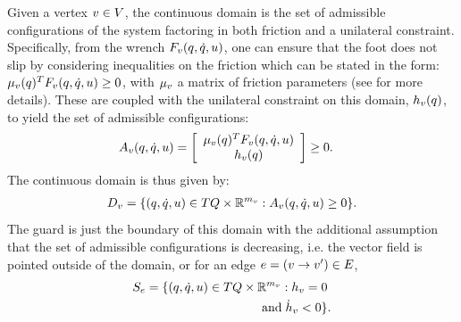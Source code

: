 Given a vertex $v \in V$, the continuous domain is the set of admissible configurations of the system factoring in both friction and a unilateral constraint. Specifically, from the wrench $F_v (q,\dot {q},u)$, one can ensure that the foot does not slip by considering inequalities on the friction which can be stated in the form: $\mu_v(q)^T F_v(q,\dot {q},u) \geq 0$, with $\mu_v$ a matrix of friction parameters (see \cite{SPSA:IFAC:11} for more details). These are coupled with the unilateral constraint on this domain, $h_v(q)$, to yield the set of admissible configurations:
\begin{align}
A_v(q,\dot {q},u) &= \left[
  \begin{array}{c}
    \mu_v(q)^T F_v(q,\dot {q},u) \\
    h_v(q)
  \end{array}
  \right] \geq 0.
\end{align}
The continuous domain is thus given by:
\begin{align}
 D_v = \{ (q,\dot {q},u) \in TQ \times \mathbb{R}^{m_v} : A_v(q,\dot {q},u) \geq 0 \}.
\end{align}
The guard is just the boundary of this domain with the additional assumption that the set of admissible configurations is decreasing, i.e. the vector field is pointed outside of the domain, or for an edge $e =(v \to v') \in E$,
\begin{align}
 S_e = \{ (q,\dot {q},u) \in TQ \times \mathbb{R}^{m_v} : h_{v} = 0 \hspace{1mm} \\
  \nonumber \text{and} \hspace{1mm} \dot{h}_{v} < 0\}.
\end{align}
